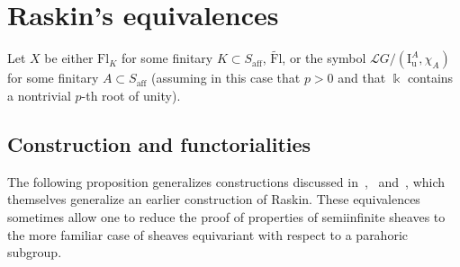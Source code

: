 \documentclass[11pt]{amsart}
\numberwithin{equation}{section}
\theoremstyle{plain}
\theoremstyle{definition}
\newcommand{\F}{{\mathbb F}}
\newcommand{\sF}{{\mathcal F}}
\newcommand{\I}{{\mathrm I}}
\renewcommand{\k}{\Bbbk}
\newcommand{\K}{{\mathbb K}}
\newcommand{\sL}{{\mathcal L}}
\newcommand{\X}{{\mathbb X}}
\newcommand{\Xd}{\check{\X}}
\newcommand{\semi}{{{\frac{\infty}{2}}}}
\newcommand{\quar}{{{\frac{\infty}{4}}}}
\newcommand{\af}{\mathrm{aff}}
\newcommand{\Shv}{\mathsf{Shv}}
\newcommand{\Fl}{\mathrm{Fl}}
\newcommand{\tFl}{\widetilde{\Fl}}
\newcommand{\Iu}{\mathrm{I}_{\mathrm{u}}}
\begin{document}
%
%

\section{Raskin's equivalences} 
\label{sec:Raskin}

Let $X$ be either $\Fl_K$ for some finitary $K \subset S_\af$, $\tFl$, or the symbol $\sL G/(\Iu^A,\chi_A)$ for some finitary $A \subset S_\af$ (assuming in this case that $p>0$ and that $\k$ contains a nontrivial $p$-th root of unity).

\subsection{Construction and functorialities} 

The following proposition generalizes constructions
discussed in~\cite[\S 5.2]{Gaits18},~\cite[Proposition~3.1.7]{DL23} and~\cite[\S2.7]{adr}, which themselves generalize an earlier construction of Raskin. These equivalences sometimes allow one to reduce the proof of properties of semiinfinite sheaves to the more familiar case of sheaves equivariant with respect to a parahoric subgroup.
\end{document}
